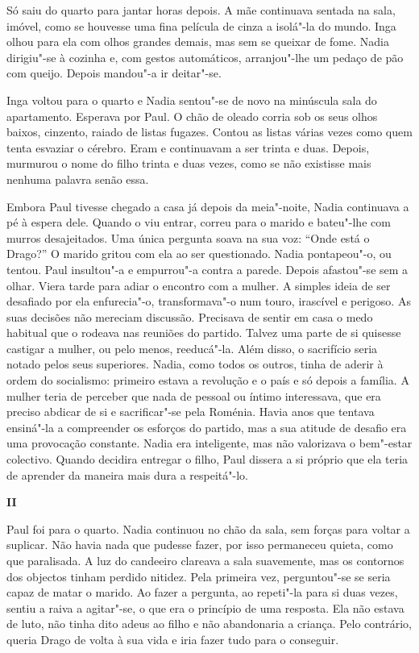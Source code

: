 Só saiu do quarto para jantar horas depois. A mãe continuava sentada
na sala, imóvel, como se houvesse uma fina película de cinza a isolá"-la
do mundo. Inga olhou para ela com olhos grandes demais, mas sem se
queixar de fome. Nadia dirigiu"-se à cozinha e, com gestos automáticos,
arranjou"-lhe um pedaço de pão com queijo. Depois mandou"-a ir deitar"-se.

Inga voltou para o quarto e Nadia sentou"-se de novo na minúscula sala do
apartamento. Esperava por Paul. O chão de oleado corria sob os seus
olhos baixos, cinzento, raiado de listas fugazes. Contou as listas
várias vezes como quem tenta esvaziar o cérebro. Eram e continuavam a
ser trinta e duas. Depois, murmurou o nome do filho trinta e duas vezes,
como se não existisse mais nenhuma palavra senão essa.

Embora Paul tivesse chegado a casa já depois da meia"-noite, Nadia continuava a pé à espera dele. Quando o viu entrar, correu
para o marido e bateu"-lhe com murros desajeitados. Uma única pergunta
soava na sua voz: ``Onde está o Drago?'' O marido gritou com ela ao ser
questionado. Nadia pontapeou"-o, ou tentou. Paul insultou"-a e
empurrou"-a contra a parede. Depois afastou"-se sem a olhar. Viera tarde
para adiar o encontro com a mulher. A simples ideia de ser desafiado por
ela enfurecia"-o, transformava"-o num touro, irascível e perigoso. As suas
decisões não mereciam discussão. Precisava de sentir em
casa o medo habitual que o rodeava nas reuniões do partido. Talvez uma
parte de si quisesse castigar a mulher, ou pelo menos, reeducá"-la. Além
disso, o sacrifício seria notado pelos seus superiores. Nadia, como
todos os outros, tinha de aderir à ordem do socialismo: primeiro estava
a revolução e o país e só depois a família. A mulher teria de perceber
que nada de pessoal ou íntimo interessava, que era preciso abdicar de
si e sacrificar"-se pela Roménia. Havia anos que tentava ensiná"-la a
compreender os esforços do partido, mas a sua atitude de desafio era uma
provocação constante. Nadia era inteligente, mas não valorizava o
bem"-estar colectivo. Quando decidira entregar o filho, Paul dissera a
si próprio que ela teria de aprender da maneira mais dura a
respeitá"-lo.


\pagebreak
\vspace*{1.8cm}
\noindent{}\textbf{II}

\bigskip


Paul foi para o quarto. Nadia continuou no chão da sala, sem forças para
voltar a suplicar. Não havia nada que pudesse fazer, por isso permaneceu
quieta, como que paralisada. A luz do candeeiro clareava a sala
suavemente, mas os contornos dos objectos tinham perdido nitidez. Pela
primeira vez, perguntou"-se se seria capaz de matar o marido. Ao fazer a
pergunta, ao repeti"-la para si duas vezes, sentiu a raiva a agitar"-se, o
que era o princípio de uma resposta. Ela não estava de luto, não tinha
dito adeus ao filho e não abandonaria a criança. Pelo contrário, queria
Drago de volta à sua vida e iria fazer tudo para o conseguir.

